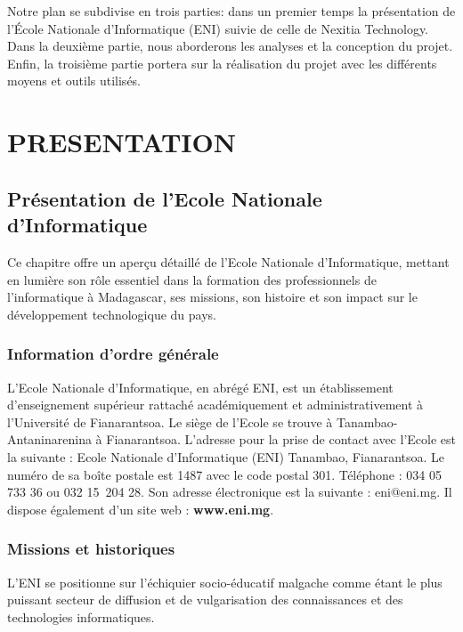 \documentclass[12pt]{report}
\begin{document}
\begin{center}
\begin{minipage}{\textwidth}
					\hspace{15pt} Notre plan se subdivise en trois parties: dans un premier temps la présentation de l’École Nationale d'Informatique (ENI) suivie de celle de Nexitia Technology. Dans la deuxième partie, nous aborderons les analyses et la conception du projet. Enfin, la troisième partie portera sur la réalisation du projet avec les différents moyens et outils utilisés.
				\end{minipage}
			\end{center}
			\part{PRESENTATION}
			\chapter{Présentation de l’Ecole Nationale d’Informatique}

			\hspace{15pt} Ce chapitre offre un aperçu détaillé de l'Ecole Nationale d’Informatique, mettant en lumière son rôle essentiel dans la formation des professionnels de l'informatique à Madagascar, ses missions, son histoire et son impact sur le développement technologique du pays.			

			\section{Information d’ordre générale }
				\hspace{15pt} L’Ecole Nationale d’Informatique, en abrégé ENI, est un établissement d’enseignement supérieur rattaché académiquement et administrativement à l’Université de Fianarantsoa. Le siège de l’Ecole se trouve à Tanambao-Antaninarenina à Fianarantsoa. L’adresse pour la prise de contact avec l’Ecole est la suivante : Ecole Nationale d’Informatique (ENI) Tanambao, Fianarantsoa. Le numéro de sa boîte postale est 1487 avec le code postal 301. Téléphone : 034 05 733 36 ou 032 15 204 28. Son adresse électronique est la suivante : eni@eni.mg. Il dispose également d'un site web : \textbf{www.eni.mg}.

			\section{Missions et historiques}
				\hspace{15pt} L’ENI se positionne sur l’échiquier socio-éducatif malgache comme étant le plus puissant secteur de diffusion et de vulgarisation des connaissances et des technologies informatiques. 
\end{document}
